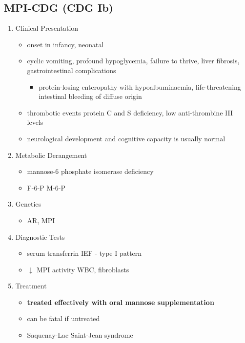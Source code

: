 \documentclass{scrartcl}
\begin{document}
\subsection{MPI-CDG (CDG Ib)}
\label{sec:org3961767}
\begin{enumerate}
\item Clinical Presentation
\label{sec:orgad6888f}
\begin{itemize}
\item onset in infancy, neonatal
\item cyclic vomiting, profound hypoglycemia, failure to thrive, liver
fibrosis, gastrointestinal complications
\begin{itemize}
\item protein-losing enteropathy with hypoalbuminaemia, life-threatening
intestinal bleeding of diffuse origin
\end{itemize}
\item thrombotic events protein C and S deficiency, low anti-thrombine III levels
\item neurological development and cognitive capacity is usually normal
\end{itemize}

\item Metabolic Derangement
\label{sec:orgad53882}
\begin{itemize}
\item mannose-6 phosphate isomerase deficiency
\item F-6-P \ce{<=>} M-6-P
\end{itemize}

\item Genetics
\label{sec:org6b2e5c7}
\begin{itemize}
\item AR, MPI
\end{itemize}

\item Diagnostic Tests
\label{sec:orgbec3dcd}
\begin{itemize}
\item serum transferrin IEF - type I pattern
\item \(\downarrow\) MPI activity WBC, fibroblasts
\end{itemize}

\item Treatment
\label{sec:org5b58f99}
\begin{itemize}
\item \textbf{treated effectively with oral mannose supplementation}
\item can be fatal if untreated
\item Saquenay-Lac Saint-Jean syndrome
\end{itemize}
\end{enumerate}
\end{document}
